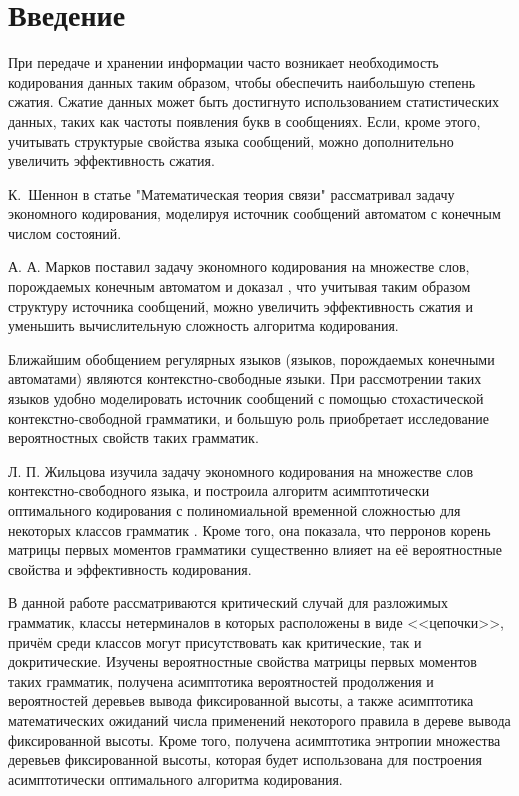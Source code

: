 \documentclass[12pt]{article}
\begin{document}
\tableofcontents
\newpage

\section{Введение}
При передаче и хранении информации часто возникает необходимость кодирования данных таким образом, чтобы обеспечить наибольшую степень сжатия. Сжатие данных может быть достигнуто использованием статистических данных, таких как частоты появления букв в сообщениях. Если, кроме этого, учитывать структурые свойства языка сообщений, можно дополнительно увеличить эффективность сжатия.

К.~Шеннон в статье "Математическая теория связи" \cite{shennon-mts} рассматривал задачу экономного кодирования, моделируя источник сообщений автоматом с конечным числом состояний.

А. А. Марков поставил задачу экономного кодирования на множестве слов, порождаемых конечным автоматом и доказал \cite{markov-coding}, что учитывая таким образом структуру источника сообщений, можно увеличить эффективность сжатия и уменьшить вычислительную сложность алгоритма кодирования.

Ближайшим обобщением регулярных языков (языков, порождаемых конечными автоматами) являются контекстно-свободные языки. При рассмотрении таких языков удобно моделировать источник сообщений с помощью стохастической контекстно-свободной грамматики, и большую роль приобретает исследование вероятностных свойств таких грамматик.

Л. П. Жильцова изучила задачу экономного кодирования на множестве слов контекстно-свободного языка, и построила алгоритм асимптотически оптимального кодирования с полиномиальной временной сложностью для некоторых классов грамматик \cite{zhiltsova-zakonom} \cite{zhiltsova-cost}. Кроме того, она показала, что перронов корень \cite{gantmaher-matrix-theory} матрицы первых моментов \cite{sevast-processes} грамматики существенно влияет на её вероятностные свойства и эффективность кодирования.


В данной работе рассматриваются критический случай для разложимых грамматик, классы нетерминалов в которых расположены в виде <<цепочки>>, причём среди классов могут присутствовать как критические, так и докритические. Изучены вероятностные свойства матрицы первых моментов таких грамматик, получена асимптотика вероятностей продолжения и вероятностей деревьев вывода фиксированной высоты, а также асимптотика математических ожиданий числа применений некоторого правила в дереве вывода фиксированной высоты. Кроме того, получена асимптотика энтропии множества деревьев фиксированной высоты, которая будет использована для построения асимптотически оптимального алгоритма кодирования.
\end{document}
